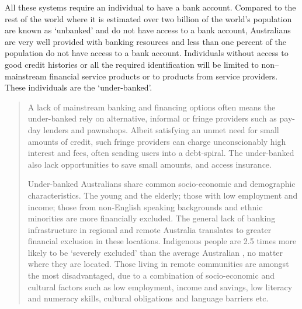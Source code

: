 All these systems require an individual to have a bank account. Compared to the rest of the world where it is estimated over two billion of the world's population are known as `unbanked' and do not have access to a bank account, Australians are very well provided with banking resources and less than one percent of the population do not have access to a bank account. Individuals without access to good credit histories or all the required identification will be limited to non--mainstream financial service products or to products from service providers. These individuals are the `under-banked'. 
\begin{quotation}
A lack of mainstream banking and financing options often means the under-banked rely on
alternative, informal or fringe providers such as pay-day lenders and pawnshops. Albeit satisfying an unmet
need for small amounts of credit, such fringe providers can charge unconscionably high interest and fees,
often sending users into a debt-spiral. The under-banked also lack opportunities to save small amounts, and
access insurance.

Under-banked Australians share common socio-economic and demographic characteristics. The
young and the elderly; those with low employment and income; those from non-English speaking
backgrounds and ethnic minorities are more financially excluded. The general lack of banking infrastructure
in regional and remote Australia translates to greater financial exclusion in these locations. Indigenous
people are 2.5 times more likely to be ‘severely excluded’ than the average Australian , no matter where they are located. Those living
in remote communities are amongst the most disadvantaged, due to a combination of socio-economic and
cultural factors such as low employment, income and savings, low literacy and numeracy skills, cultural
obligations and language barriers etc\cite[p4]{RefWorks:292}.
\end{quotation}

